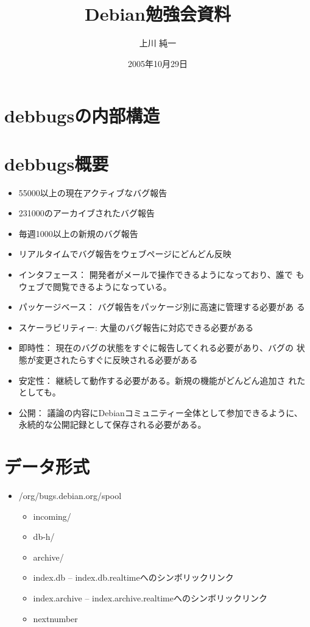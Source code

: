 \documentclass[cjk,dvipdfmx]{beamer}
\title{Debian勉強会資料}
\author{上川 純一}
\date{2005年10月29日}
\begin{document}

\frame{\titlepage}

\section{debbugsの内部構造}
\section{debbugs概要}

\begin{frame}
\begin{itemize}
 \item 55000以上の現在アクティブなバグ報告
 \item 231000のアーカイブされたバグ報告
 \item 毎週1000以上の新規のバグ報告
 \item リアルタイムでバグ報告をウェブページにどんどん反映
\end{itemize}
\end{frame}


\begin{frame}
 \begin{itemize}
 \item インタフェース： 開発者がメールで操作できるようになっており、誰で
       もウェブで閲覧できるようになっている。
 \item パッケージベース： バグ報告をパッケージ別に高速に管理する必要があ
       る
 \item スケーラビリティー: 大量のバグ報告に対応できる必要がある
 \item 即時性： 現在のバグの状態をすぐに報告してくれる必要があり、バグの
       状態が変更されたらすぐに反映される必要がある
 \item 安定性： 継続して動作する必要がある。新規の機能がどんどん追加さ
       れたとしても。
 \item 公開： 議論の内容にDebianコミュニティー全体として参加できるように、
       永続的な公開記録として保存される必要がある。
 \end{itemize}
\end{frame}

\section{データ形式}

\begin{frame}
 \begin{itemize}
 \item /org/bugs.debian.org/spool
       \begin{itemize}
	\item incoming/
	\item db-h/
	\item archive/
	\item index.db -- index.db.realtimeへのシンボリックリンク
	\item index.archive -- index.archive.realtimeへのシンボリックリンク
	\item nextnumber
       \end{itemize}
 \end{itemize}
\end{frame}
\end{document}
